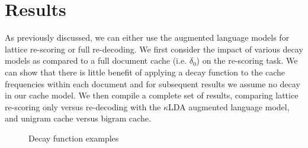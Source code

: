 \section{Results}

As previously discussed, we can either use the augmented language models for lattice re-scoring or full re-decoding.  We first consider the impact of various decay models as compared to a full document cache (i.e. $\delta_0$) on the re-scoring task.  We can show that there is little benefit of applying a decay function to the cache frequencies within each document and for subsequent results we assume no decay in our cache model.  We then compile a complete set of results, comparing lattice re-scoring only versus re-decoding with the $\kappa$LDA augmented language model, and unigram cache versus bigram cache.  

\begin{figure}
\begin{center}
{}
\end{center}
\caption[Decay function examples]{Decay function examples \label{fig7:examples}}
\end{figure}

